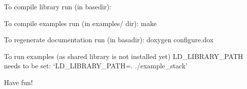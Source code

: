 To compile library run (in basedir)\+: 
\begin{DoxyCode}{0}
\end{DoxyCode}


To compile examples run (in examples/ dir)\+: {\ttfamily make}

To regenerate documentation run (in basadir)\+: {\ttfamily doxygen configure.\+dox}

To run examples (as shared library is not installed yet) L\+D\+\_\+\+L\+I\+B\+R\+A\+R\+Y\+\_\+\+P\+A\+TH needs to be set\+: `L\+D\+\_\+\+L\+I\+B\+R\+A\+R\+Y\+\_\+\+P\+A\+TH=. ./example\+\_\+stack'

Have fun! 